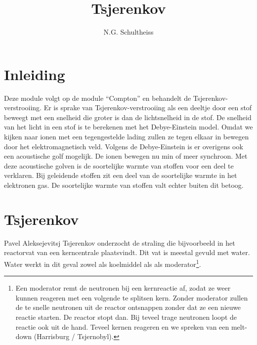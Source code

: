 



\title{Tsjerenkov}
\author{N.G. Schultheiss}
\date{}

\maketitle
\thispagestyle{firststyle}

\section{Inleiding}

Deze module volgt op de module ``Compton'' en behandelt de Tsjerenkov-verstrooiing.
Er is sprake van Tsjerenkov-verstrooiing als een deeltje door een
stof beweegt met een snelheid die groter is dan de lichtsnelheid in
de stof. De snelheid van het licht in een stof is te berekenen met
het Debye-Einstein model. Omdat we kijken naar ionen met een tegengestelde
lading zullen ze tegen elkaar in bewegen door het elektromagnetisch
veld. Volgens de Debye-Einstein is er overigens ook een acoustische
golf mogelijk. De ionen bewegen nu min of meer synchroon. Met deze
acoustische golven is de soortelijke warmte van stoffen voor een deel
te verklaren. Bij geleidende stoffen zit een deel van de soortelijke
warmte in het elektronen gas. De soortelijke warmte van stoffen valt
echter buiten dit betoog. 


\section{Tsjerenkov}

Pavel Aleksejevitsj Tsjerenkov onderzocht de straling die bijvoorbeeld
in het reactorvat van een kerncentrale plaatsvindt. Dit vat is meestal
gevuld met water. Water werkt in dit geval zowel als koelmiddel als als
moderator\footnote{Een moderator remt de neutronen bij een
kernreactie af, zodat ze weer kunnen reageren met een volgende te
splitsen kern. Zonder moderator zullen de te snelle neutronen uit de
reactor ontsnappen zonder dat ze een nieuwe reactie starten. De reactor
stopt dan. Bij teveel trage neutronen loopt de reactie ook uit de hand.
Teveel kernen reageren en we spreken van een melt-down (Harrisburg /
Tsjernobyl).}.

